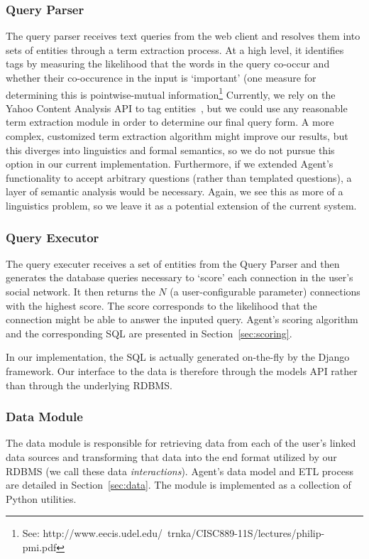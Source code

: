\subsubsection{Query Parser}
The query parser receives text queries from the web client and resolves them
into sets of entities through a term extraction process. At a high level, it
identifies tags by measuring the likelihood that the words in the query co-occur
and whether their co-occurence in the input is `important' (one measure for
determining this is pointwise-mutual information\footnote{See:
http://www.eecis.udel.edu/~trnka/CISC889-11S/lectures/philip-pmi.pdf} Currently,
we rely on the Yahoo Content Analysis API to tag entities~\cite{yahoo_ca}, but
we could use any reasonable term extraction module in order to determine our
final query form. A more complex, customized term extraction algorithm might
improve our results, but this diverges into linguistics and formal semantics, so
we do not pursue this option in our current implementation.  Furthermore, if we
extended Agent's functionality to accept arbitrary questions (rather than
templated questions), a layer of semantic analysis would be necessary. Again, we
see this as more of a linguistics problem, so we leave it as a potential
extension of the current system.

\subsubsection{Query Executor}
The query executer receives a set of entities from the Query Parser and then
generates the database queries necessary to `score' each connection in the
user's social network.  It then returns the $N$ (a user-configurable parameter)
connections with the highest score.  The score corresponds to the likelihood
that the connection might be able to answer the inputed query. Agent's scoring
algorithm and the corresponding SQL are presented in Section~\ref{sec:scoring}.

In our implementation, the SQL is actually generated on-the-fly by the Django
framework. Our interface to the data is therefore through the models API rather
than through the underlying RDBMS.

\subsubsection{Data Module}
The data module is responsible for retrieving data from each of the user's
linked data sources and transforming that data into the end format utilized by
our RDBMS (we call these data {\it interactions}). Agent's data model and ETL
process are detailed in Section~\ref{sec:data}. The module is implemented as a
collection of Python utilities.


